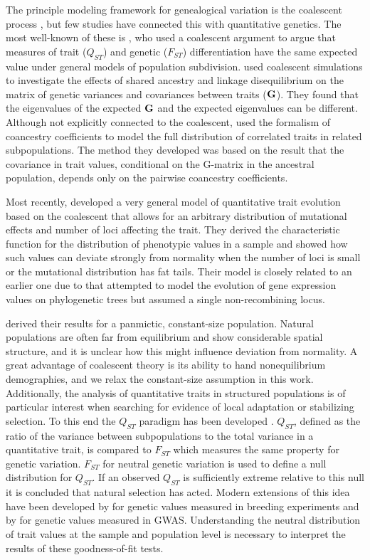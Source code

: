 The principle modeling framework for genealogical variation is the coalescent
process \citep{Wakeley2008}, but few studies have connected this with
quantitative genetics. The most well-known of these is
\citet{Whitlock1999}, who used a coalescent argument to argue that measures of trait ($Q_{ST}$) and
genetic ($F_{ST}$) differentiation have the same expected value under general
models of population subdivision. \citet{Griswold2007} used coalescent
simulations to investigate the effects of shared ancestry and linkage
disequilibrium on the matrix of genetic variances and covariances between traits
($\mbox{\textbf{G}}$). They found that the eigenvalues of the expected
$\mbox{\textbf{G}}$ and the expected eigenvalues can be different. Although not
explicitly connected to the coalescent,
\citet{Ovaskainen2011} used the formalism of coancestry coefficients to model
the full distribution of correlated traits in related subpopulations. The method
they developed was based on the result that the covariance in trait values,
conditional on the G-matrix in the ancestral population, depends only on the
pairwise coancestry coefficients.

Most recently, \citet{Schraiber2015} developed a very general model of
quantitative trait evolution based on the coalescent that allows for an
arbitrary distribution of mutational effects and number of loci affecting the
trait. They derived the characteristic function for the distribution of
phenotypic values in a sample and showed how such values can deviate strongly
from normality when the number of loci is small or the mutational distribution
has fat tails. Their model is closely related to an earlier one due
to \citet{Khaitovich2005} that attempted to model the evolution of gene
expression values on phylogenetic trees but assumed a single non-recombining
locus.

\citet{Schraiber2015} derived their results for a panmictic, constant-size
population. Natural populations are often far from equilibrium and show
considerable spatial structure, and it is unclear how this might influence
deviation from normality. A great advantage of coalescent theory is its ability
to hand nonequilibrium demographies, and we relax the constant-size assumption
in this work. Additionally, the analysis of quantitative traits in structured
populations is of particular interest when searching for evidence of local
adaptation or stabilizing selection. To this end the $Q_{ST}$ paradigm has been
developed \citep{Whitlock2008,Spitze1993}. $Q_{ST}$, defined as the ratio of the
variance between subpopulations to the total variance in a quantitative trait,
is compared to $F_{ST}$ which measures the same property for genetic variation.
$F_{ST}$ for neutral genetic variation is used to define a null distribution for
$Q_{ST}$. If an observed $Q_{ST}$ is sufficiently extreme relative to this null
it is concluded that natural selection has acted. Modern extensions of this idea
have been developed by \citet{Ovaskainen2011} for genetic values measured in
breeding experiments and by \citet{Berg2014} for genetic values measured in
GWAS. Understanding the neutral distribution of trait values at the sample and
population level is necessary to interpret the results of these goodness-of-fit
tests.


